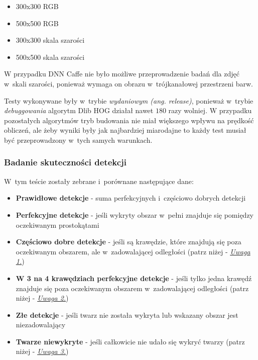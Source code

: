 \begin{itemize}
    \item 300x300 RGB
    \item 500x500 RGB
    \item 300x300 skala szarości
    \item 500x500 skala szarości
\end{itemize}

W przypadku DNN Caffe nie było możliwe przeprowadzenie badań dla zdjęć w~skali szarości, ponieważ wymaga on obrazu w~trójkanałowej przestrzeni barw.

\par

Testy wykonywane były w~trybie \textit{wydaniowym (ang. release)}, ponieważ w~trybie \textit{debuggowania} algorytm Dlib HOG działał nawet $180$ razy wolniej. W przypadku pozostałych algorytmów tryb budowania nie miał większego wpływu na prędkość obliczeń, ale żeby wyniki były jak najbardziej miarodajne to każdy test musiał być przeprowadzony w~tych samych warunkach.







\subsubsection{Badanie skuteczności detekcji} \label{section:skutecznosc_detekcji_twarzy}

W~tym teście zostały zebrane i~porównane następujące dane:
\begin{itemize}
    \item \textbf{Prawidłowe detekcje} - suma perfekcyjnych i~częściowo dobrych detekcji
    \item \textbf{Perfekcyjne detekcje} - jeśli wykryty obszar w~pełni znajduje się pomiędzy oczekiwanym prostokątami
    \item \textbf{Częściowo dobre detekcje} - jeśli są krawędzie, które znajdują się poza oczekiwanym obszarem, ale w~zadowalającej odległości (patrz niżej - \hyperref[{uwaga:czesciowo_dobry}]{\textit{Uwaga 1.}})
    \item \textbf{W 3 na 4 krawędziach perfekcyjne detekcje} - jeśli tylko jedna krawędź znajduje się poza oczekiwanym obszarem w~zadowalającej odległości (patrz niżej - \hyperref[{uwaga:3_4_perfekcyjny}]{\textit{Uwaga 2.}})
    \item \textbf{Złe detekcje} - jeśli twarz nie została wykryta lub wskazany obszar jest niezadowalający
    \item \textbf{Twarze niewykryte} - jeśli całkowicie nie udało się wykryć twarzy (patrz niżej - \hyperref[{uwaga:dodatkowy_zle}]{\textit{Uwaga 3.}})
\end{itemize}


